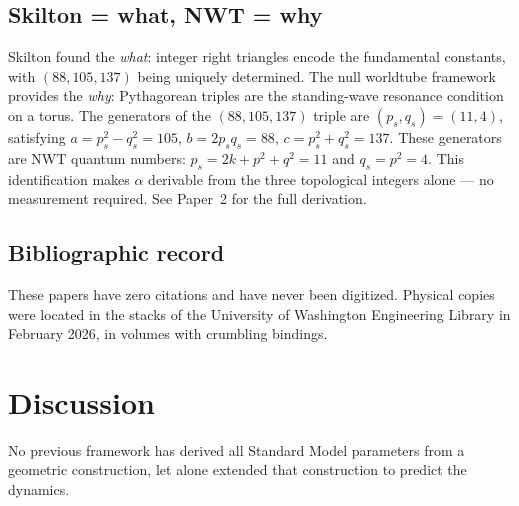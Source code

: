 \documentclass[11pt,a4paper]{article}
\begin{document}
\subsection{Skilton = what, NWT = why}

Skilton found the \emph{what}: integer right triangles encode the fundamental constants, with $(88, 105, 137)$ being uniquely determined. The null worldtube framework provides the \emph{why}: Pythagorean triples are the standing-wave resonance condition on a torus. The generators of the $(88, 105, 137)$ triple are $(p_s, q_s) = (11, 4)$, satisfying $a = p_s^2 - q_s^2 = 105$, $b = 2p_s q_s = 88$, $c = p_s^2 + q_s^2 = 137$. These generators are NWT quantum numbers: $p_s = 2k + p^2 + q^2 = 11$ and $q_s = p^2 = 4$. This identification makes $\alpha$ derivable from the three topological integers alone --- no measurement required. See Paper~2 for the full derivation.

\subsection{Bibliographic record}

These papers have zero citations and have never been digitized. Physical copies were located in the stacks of the University of Washington Engineering Library in February 2026, in volumes with crumbling bindings.

\section{Discussion}
\label{sec:discussion}

No previous framework has derived all Standard Model parameters from a geometric construction, let alone extended that construction to predict the dynamics.
\end{document}
